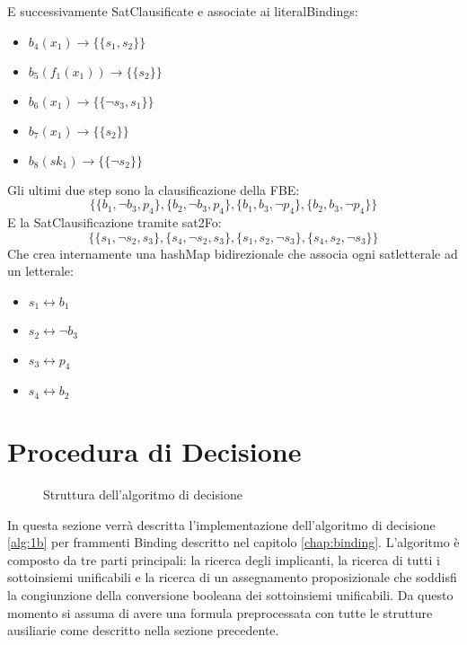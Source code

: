 \documentclass[./main.tex]{subfiles}
\begin{document}
E successivamente SatClausificate e associate ai literalBindings:
\begin{itemize}
    \item $b_4(x_1) \rightarrow \{\{s_1, s_2\}\}$
    \item $b_5(f_1(x_1)) \rightarrow \{\{s_2\}\}$
    \item $b_6(x_1) \rightarrow \{\{\lnot s_3, s_1\}\}$
    \item $b_7(x_1) \rightarrow \{\{s_2\}\}$
    \item $b_8(sk_1) \rightarrow \{\{\lnot s_2\}\}$
\end{itemize}

Gli ultimi due step sono la clausificazione della FBE:
$$ \{\{b_1, \lnot b_3, p_4\}, \{b_2, \lnot b_3, p_4\}, \{b_1, b_3, \lnot p_4\}, \{b_2,  b_3, \lnot p_4\}\} $$
E la SatClausificazione tramite sat2Fo:
$$ \{\{s_1, \lnot s_2, s_3\}, \{s_4, \lnot s_2, s_3\}, \{s_1, s_2, \lnot s_3\}, \{s_4,  s_2, \lnot s_3\}\} $$
Che crea internamente una hashMap bidirezionale che associa ogni satletterale ad un letterale:
\begin{multicols}{2}
\begin{itemize}
    \item $s_1 \leftrightarrow b_1$
    \item $s_2 \leftrightarrow \lnot b_3$
    \item $s_3 \leftrightarrow p_4$
    \item $s_4 \leftrightarrow b_2$
\end{itemize} 
\end{multicols}



\section{Procedura di Decisione} \label{sec:decisione}
\begin{figure}[H]
    \centering
    \scalebox{0.55}{
        
    }
    \caption{Struttura dell'algoritmo di decisione}
    \label{fig:algoritmo_decisione}
\end{figure}

In questa sezione verrà descritta l'implementazione dell'algoritmo di decisione \ref{alg:1b}
per frammenti Binding descritto nel capitolo \ref{chap:binding}.
L'algoritmo è composto da tre parti principali: la ricerca degli implicanti,
la ricerca di tutti i sottoinsiemi unificabili e la ricerca di un assegnamento proposizionale 
che soddisfi la congiunzione della conversione booleana dei sottoinsiemi unificabili.
Da questo momento si assuma di avere una formula preprocessata con tutte le strutture ausiliarie come descritto nella sezione precedente.
\end{document}
